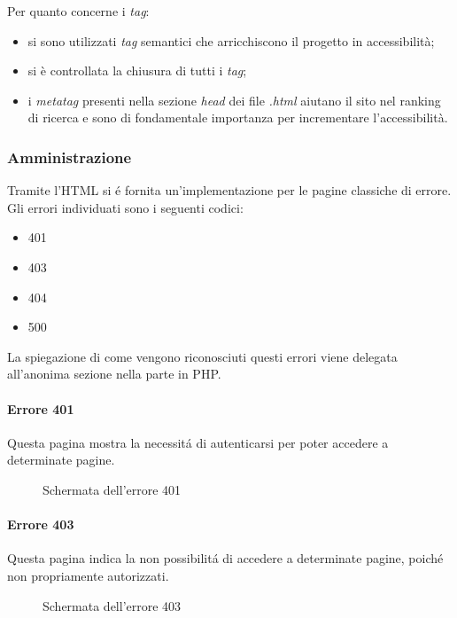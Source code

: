\documentclass[]{article}
\begin{document}
Per quanto concerne i \textit{tag}:
\begin{itemize}
	\item si sono utilizzati \textit{tag} semantici che arricchiscono il progetto in accessibilità;
	\item si è controllata la chiusura di tutti i \textit{tag};
	\item i \textit{metatag} presenti nella sezione \textit{head} dei file \textit{.html} aiutano il sito nel ranking di ricerca e sono di fondamentale importanza per incrementare l'accessibilità.
\end{itemize}

\subsubsection{Amministrazione}
Tramite l'HTML si é fornita un'implementazione per le pagine classiche di errore.\\
Gli errori individuati sono i seguenti codici:
\begin{itemize}
	\item 401
	\item 403
	\item 404
	\item 500
\end{itemize}
La spiegazione di come vengono riconosciuti questi errori viene delegata all'anonima sezione nella parte in PHP.
\paragraph*{Errore 401}
Questa pagina mostra la necessitá di autenticarsi per poter accedere a determinate pagine.
\begin{figure}[H]
	\centering
	\caption{Schermata dell'errore 401}
\end{figure}
\paragraph*{Errore 403}
Questa pagina indica la non possibilitá di accedere a determinate pagine, poiché non propriamente autorizzati.
\begin{figure}[H]
	\centering
	\caption{Schermata dell'errore 403}
\end{figure}
\end{document}

